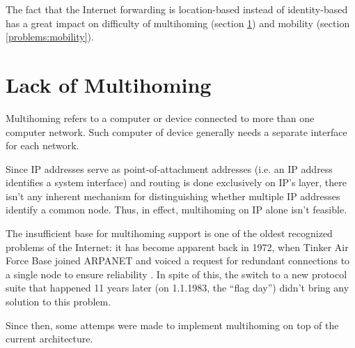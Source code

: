         The fact that the Internet forwarding is location-based instead of identity-based has a great impact on difficulty of multihoming (section \ref{problems:multihoming}) and mobility (section \ref{problems:mobility}).

    \section{Lack of Multihoming}\label{problems:multihoming}

        Multihoming refers to a computer or device connected to more than one computer network. Such computer of device generally needs a separate interface for each network.

        Since IP addresses serve as point-of-attachment addresses (i.e. an IP address identifies a system interface) and routing is done exclusively on IP's layer, there isn't any inherent mechanism for distinguishing whether multiple IP addresses identify a common node. Thus, in effect, multihoming on IP alone isn't feasible.

        The insufficient base for multihoming support is one of the oldest recognized problems of the Internet: it has become apparent back in 1972, when Tinker Air Force Base joined ARPANET and voiced a request for redundant connections to a single node to ensure reliability \cite{Patterns}. In spite of this, the switch to a new protocol suite that happened 11 years later (on 1.1.1983, the ``flag day'') didn't bring any solution to this problem.

        Since then, some attemps were made to implement multihoming on top of the current architecture.

